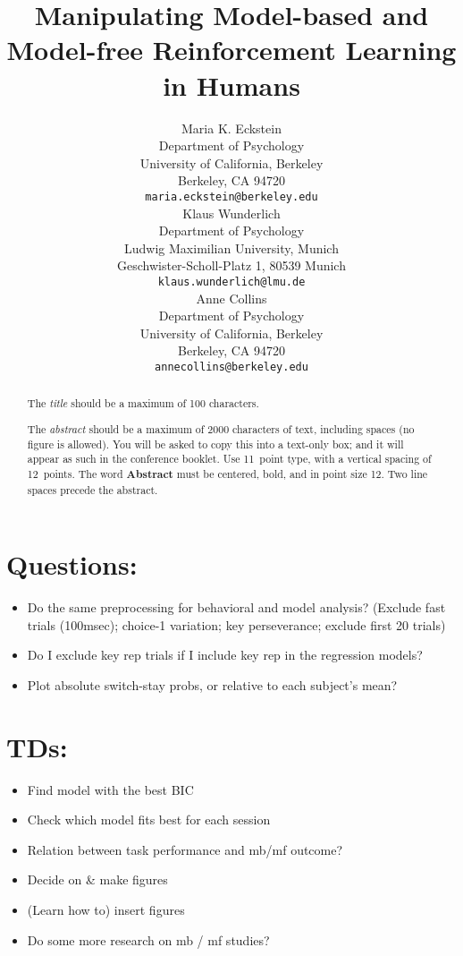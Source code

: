 \documentclass[11pt]{article} %
\title{Manipulating Model-based and Model-free Reinforcement Learning in Humans}
\author{
Maria K. Eckstein \\
Department of Psychology \\
University of California, Berkeley \\
Berkeley, CA 94720 \\
\texttt{maria.eckstein@berkeley.edu} \\
\And
Klaus Wunderlich \\
Department of Psychology \\
Ludwig Maximilian University, Munich \\
Geschwister-Scholl-Platz 1, 80539 Munich \\
\texttt{klaus.wunderlich@lmu.de} \\
\And
Anne Collins \\
Department of Psychology\\
University of California, Berkeley \\
Berkeley, CA 94720  \\
\texttt{annecollins@berkeley.edu} \\
}
\begin{document}
\maketitle

\begin{abstract}
The \emph{title} should be a maximum of 100 characters. 

The \emph{abstract} should be a maximum of 2000 characters of text,
including spaces (no figure is allowed). You will be asked to copy
this into a text-only box; and it will appear as such in the
conference booklet. Use 11~point type, with a vertical spacing of
12~points.  The word \textbf{Abstract} must be centered, bold, and in
point size 12. Two line spaces precede the abstract.
\end{abstract}




\startmain %

\section{Questions:}
\begin{itemize}
	\item Do the same preprocessing for behavioral and model analysis? (Exclude fast trials (100msec); choice-1 variation; key perseverance; exclude first 20 trials)
	\item Do I exclude key rep trials if I include key rep in the regression models?
	\item Plot absolute switch-stay probs, or relative to each subject's mean?
\end{itemize}

\section{TDs:}
\begin{itemize}
	\item Find model with the best BIC
	\item Check which model fits best for each session
	\item Relation between task performance and mb/mf outcome?
	\item Decide on \& make figures
	\item (Learn how to) insert figures
	\item Do some more research on mb / mf studies?
\end{itemize}
\end{document}
